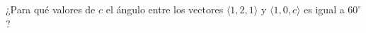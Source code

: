 \item ¿Para qué valores de $c$ el ángulo entre los vectores $\langle 1, 2, 1 \rangle$ y $\langle 1, 0, c \rangle$ es igual a $60^\circ$?
